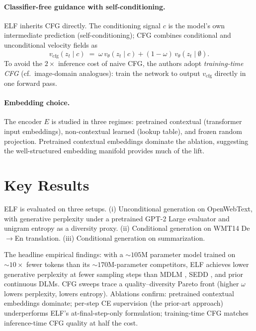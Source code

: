 \documentclass[11pt]{article}
\begin{document}
\paragraph{Classifier-free guidance with self-conditioning.}
ELF inherits CFG \citep{ho2022cfg} directly. The conditioning signal $c$ is the model's own intermediate prediction (self-conditioning); CFG combines conditional and unconditional velocity fields as
\begin{equation}
v_{\text{cfg}}(z_t \mid c) \;=\; \omega \, v_\theta(z_t \mid c) + (1 - \omega) \, v_\theta(z_t \mid \emptyset).
\label{eq:cfg}
\end{equation}
To avoid the $2\times$ inference cost of naive CFG, the authors adopt \emph{training-time CFG} (cf.\ image-domain analogues): train the network to output $v_\text{cfg}$ directly in one forward pass.

\paragraph{Embedding choice.}
The encoder $E$ is studied in three regimes: pretrained contextual (transformer input embeddings), non-contextual learned (lookup table), and frozen random projection. Pretrained contextual embeddings dominate the ablation, suggesting the well-structured embedding manifold provides much of the lift.

\section*{Key Results}

ELF is evaluated on three setups. (i) Unconditional generation on OpenWebText, with generative perplexity under a pretrained GPT-2 Large evaluator and unigram entropy as a diversity proxy. (ii) Conditional generation on WMT14 De$\to$En translation. (iii) Conditional generation on summarization.

The headline empirical findings: with a $\sim 105$M parameter model trained on $\sim 10\times$ fewer tokens than its $\sim 170$M-parameter competitors, ELF achieves lower generative perplexity at fewer sampling steps than MDLM \citep{sahoo2024mdlm}, SEDD \citep{lou2024sedd}, and prior continuous DLMs. CFG sweeps trace a quality--diversity Pareto front (higher $\omega$ lowers perplexity, lowers entropy). Ablations confirm: pretrained contextual embeddings dominate; per-step CE supervision (the prior-art approach) underperforms ELF's at-final-step-only formulation; training-time CFG matches inference-time CFG quality at half the cost.
\end{document}
